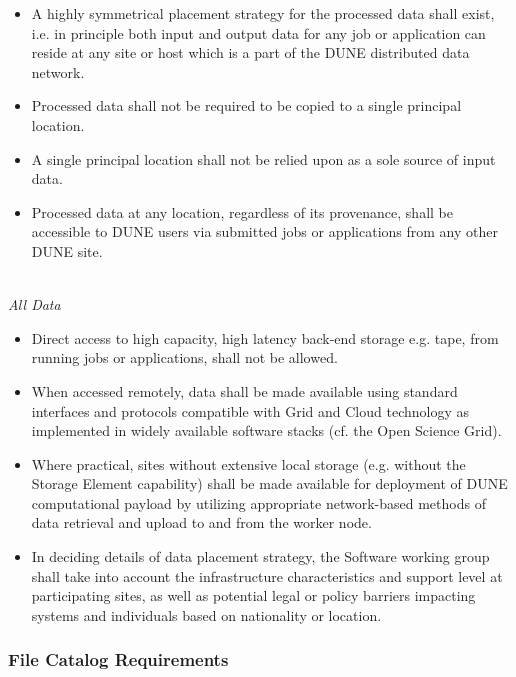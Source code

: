 \begin{itemize}
\item A highly symmetrical placement strategy for the processed data shall exist, i.e. in principle both input and output data for any job or application can reside at any site or host which is a part of the DUNE distributed data network.

\item Processed data shall not be required to be copied to a single principal location.

\item A single principal location shall not be relied upon as a sole source of input data.

\item Processed data at any location, regardless of its provenance,  shall be accessible to DUNE users via submitted jobs or applications from any other DUNE site.
\end{itemize}
\ 
\\
\textit{All Data}
\begin{itemize}
\item Direct access to high capacity, high latency back-end storage e.g. tape, from running jobs or applications, shall not be allowed.

\item When accessed remotely, data shall be made available using standard interfaces and protocols compatible with Grid and Cloud technology as implemented in widely available software stacks (cf. the Open Science Grid).

\item Where practical, sites without extensive local storage (e.g. without the Storage Element capability) shall be made available for deployment of DUNE 
computational payload by utilizing appropriate network-based methods of data retrieval and upload to and from the worker node.

\item In deciding details of data placement strategy, the Software working group shall take into account the infrastructure characteristics
and support level at participating sites, as well as potential legal or policy barriers impacting systems and individuals based on nationality or location.


\end{itemize}

\subsubsection{File Catalog Requirements}

